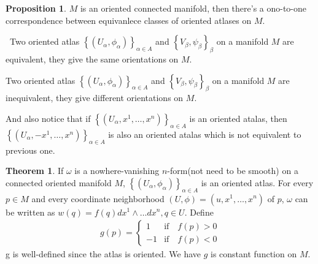 \documentclass[12pt,a4paper]{book}
\newenvironment{prooff}{{\noindent\it\textcolor{cyan!40!black}{Proof}:}\,}{\par}
\newcommand{\bbrace}[1]{\left\{ #1 \right\} }
\theoremstyle{definition}
\newtheorem{theo}[defn]{Theorem}
\newtheorem{prop}[defn]{Proposition}
\begin{document}
\begin{prop}
    $M$ is an oriented connected manifold, then
    there's a ono-to-one correspondence between
    equivanlece classes of oriented atlases on $M$.
\end{prop}
\begin{prooff}
    Two oriented atlas $\bbrace{(U_{\alpha},\phi_{\alpha})}_{\alpha\in A}$ and $\bbrace{V_{\beta},\psi_{\beta}}_{\beta}$
    on a manifold $M$ are equivalent, they give the same orientations on $M$.

    Two oriented atlas $\bbrace{(U_{\alpha},\phi_{\alpha})}_{\alpha\in A}$ and $\bbrace{V_{\beta},\psi_{\beta}}_{\beta}$
    on a manifold $M$ are inequivalent, they give different orientations on $M$.

    And also notice that if $\bbrace{(U_{\alpha},x^1,\dots,x^n)}_{\alpha\in A}$ is an oriented atalas, then
    $\bbrace{(U_{\alpha},-x^1,\dots,x^n)}_{\alpha\in A}$ is also an oriented atalas which is not equivalent to previous one.
\end{prooff}
\begin{theo}
    If $\omega$ is a nowhere-vanishing $n$-form(not need to be smooth) on a connected oriented manifold $M$, $\bbrace{(U_{\alpha},\phi_{\alpha})}_{\alpha\in A}$ is an oriented atlas. For every $p\in M$ and every coordinate neighborhood $(U,\phi)=(u,x^1,\dots,x^n)$ of $p$, $\omega$ can be
    written as $w(q)=f(q)dx^1\wedge \dots dx^n, q\in U$. Define
    \begin{align}
        g(p)=
        \begin{cases}
            1  & \text{if} \quad f(p)>0 \\
            -1 & \text{if} \quad f(p)<0
        \end{cases}
    \end{align}
    g is well-defined since  the atlas is oriented. We have $g$ is constant function on $M$.
\end{theo}
\end{document}
